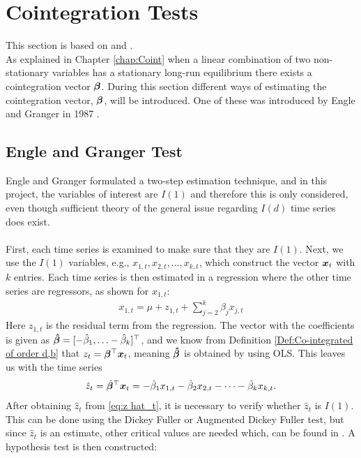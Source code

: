 \chapter{Cointegration Tests}\label{chap:coint tests}
This section is based on \cite{Analysis_of_integrated_and_cointegrated_time_series_with_R} and \cite{Engle_grang_test}.\\
\noindent As explained in Chapter \ref{chap:Coint} when a linear combination of two non-stationary variables has a stationary long-run equilibrium there exists a cointegration vector $\boldsymbol{\beta}$. During this section different ways of estimating the cointegration vector, $\boldsymbol{\beta}$, will be introduced. One of these was introduced by Engle and Granger in 1987 \cite{co-Integration_and_error_correction}.
\section{Engle and Granger Test}
Engle and Granger formulated a two-step estimation technique, and in this project, the variables of interest are $I(1)$ and therefore this is only considered, even though sufficient theory of the general issue regarding $I(d)$ time series does exist. \\\\ 
First, each time series is examined to make sure that they are $I(1)$. Next, we use the $I(1)$ variables, e.g., $x_{1,t},x_{2,t},\ldots,x_{k,t}$, which construct the vector $\boldsymbol{x}_t$ with $k$ entries. Each time series is then estimated in a regression where the other time series are regressors, as shown for $x_{1,t}$:
\begin{align*}
    x_{1,t}=\mu+z_{1,t}+\sum^k_{j=2}\beta_j x_{j,t}
\end{align*}
Here $z_{1,t}$ is the residual term from the regression. The vector with the coefficients is given as $\boldsymbol{\hat{\beta}}=[-\hat{\beta}_1,\ldots-\hat{\beta}_k]^\top$, and we know from Definition \ref{Def:Co-integrated of order d,b} that $z_t=\boldsymbol{\beta}^\top \boldsymbol{x}_t$, meaning $\boldsymbol{\hat{\beta}}$ is obtained by using OLS. This leaves us with the time series
\begin{align}\label{eq:z hat_t}
\hat{z}_t=\hat{\boldsymbol{\beta}}^\top \boldsymbol{x}_t=-\hat{\beta}_{1}x_{1,t}-\hat{\beta}_{2}x_{2,t}-\cdots-\hat{\beta}_{k}x_{k,t}.
\end{align}
After obtaining $\hat{z}_t$ from \eqref{eq:z hat_t}, it is necessary to verify whether $\hat{z}_t$ is $I(1)$. This can be done using the Dickey Fuller or Augmented Dickey Fuller test, but since $\hat{z}_t$ is an estimate, other critical values are needed which, can be found in \cite{ENGLE1987143}. A hypothesis test is then constructed:
